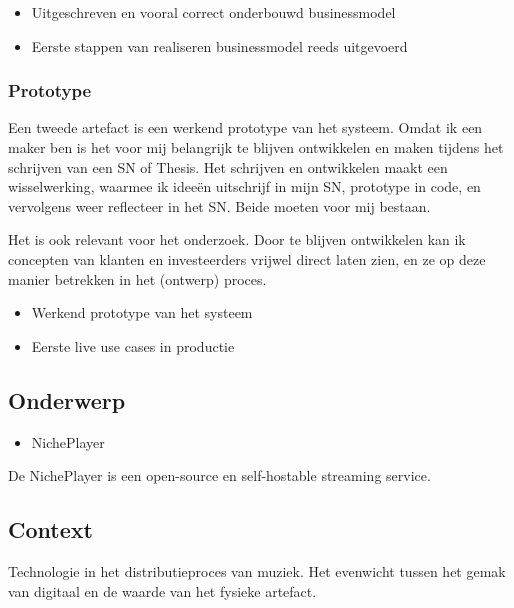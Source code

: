 \begin{itemize}
    \item Uitgeschreven en vooral correct onderbouwd businessmodel
    \item Eerste stappen van realiseren businessmodel reeds uitgevoerd
\end{itemize}

\subsubsection*{Prototype}
Een tweede artefact is een werkend prototype van het systeem. Omdat ik een maker ben is het voor mij belangrijk te blijven ontwikkelen en maken tijdens het schrijven van een SN of Thesis. Het schrijven en ontwikkelen maakt een wisselwerking, waarmee ik ideeën uitschrijf in mijn SN, prototype in code, en vervolgens weer reflecteer in het SN. Beide moeten voor mij bestaan.

Het is ook relevant voor het onderzoek. Door te blijven ontwikkelen kan ik concepten van klanten en investeerders vrijwel direct laten zien, en ze op deze manier betrekken in het (ontwerp) proces.

\begin{itemize}
    \item Werkend prototype van het systeem
    \item Eerste live use cases in productie
\end{itemize}

\subsection{Onderwerp}
\begin{itemize}
    \item NichePlayer
\end{itemize}
De NichePlayer is een open-source en self-hostable streaming service. 

\subsection{Context}
Technologie in het distributieproces van muziek. Het evenwicht tussen het gemak van digitaal en de waarde van het fysieke artefact.

